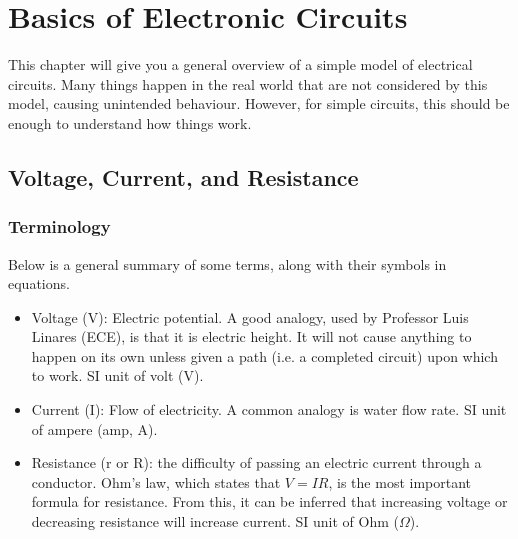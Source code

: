 \chapter{Basics of Electronic Circuits}

This chapter will give you a general overview of a simple model of electrical circuits. Many things happen in the real world that are not considered by this model, causing unintended behaviour. However, for simple circuits, this should be enough to understand how things work.
\section{Voltage, Current, and Resistance}
\subsection{Terminology}
Below is a general summary of some terms, along with their symbols in equations.
\begin{itemize}
	\item Voltage (V): Electric potential. A good analogy, used by Professor Luis Linares (ECE), is that it is electric height. It will not cause anything to happen on its own unless given a path (i.e. a completed circuit) upon which to work. SI unit of volt (V).
	\item Current (I): Flow of electricity. A common analogy is water flow rate. SI unit of ampere (amp, A).
	\item Resistance (r or R): the difficulty of passing an electric current through a conductor. Ohm's law, which states that $V=IR$, is the most important formula for resistance. From this, it can be inferred that increasing voltage or decreasing resistance will increase current. SI unit of Ohm ($\Omega$).
\end{itemize}

